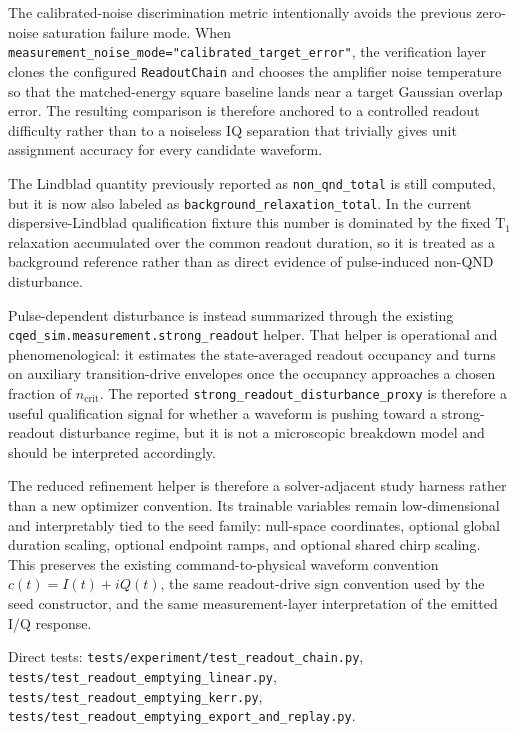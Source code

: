 \documentclass[11pt]{article}
\begin{document}
\noindent
The calibrated-noise discrimination metric intentionally avoids the previous
zero-noise saturation failure mode. When
\texttt{measurement\_noise\_mode="calibrated\_target\_error"}, the verification
layer clones the configured \texttt{ReadoutChain} and chooses the amplifier noise
temperature so that the matched-energy square baseline lands near a target Gaussian
overlap error. The resulting comparison is therefore anchored to a controlled
readout difficulty rather than to a noiseless IQ separation that trivially gives
unit assignment accuracy for every candidate waveform.

\noindent
The Lindblad quantity previously reported as \texttt{non\_qnd\_total} is still
computed, but it is now also labeled as
\texttt{background\_relaxation\_total}. In the current dispersive-Lindblad
qualification fixture this number is dominated by the fixed \(\mathrm{T}_1\)
relaxation accumulated over the common readout duration, so it is treated as a
background reference rather than as direct evidence of pulse-induced non-QND
disturbance.

\noindent
Pulse-dependent disturbance is instead summarized through the existing
\texttt{cqed\_sim.measurement.strong\_readout} helper. That helper is
operational and phenomenological: it estimates the state-averaged readout occupancy
and turns on auxiliary transition-drive envelopes once the occupancy approaches a
chosen fraction of \(n_{\mathrm{crit}}\). The reported
\texttt{strong\_readout\_disturbance\_proxy} is therefore a useful qualification
signal for whether a waveform is pushing toward a strong-readout disturbance regime,
but it is not a microscopic breakdown model and should be interpreted accordingly.

\noindent
The reduced refinement helper is therefore a solver-adjacent study harness rather
than a new optimizer convention. Its trainable variables remain low-dimensional and
interpretably tied to the seed family: null-space coordinates, optional global
duration scaling, optional endpoint ramps, and optional shared chirp scaling. This
preserves the existing command-to-physical waveform convention
\(c(t)=I(t)+iQ(t)\), the same readout-drive sign convention used by the seed
constructor, and the same measurement-layer interpretation of the emitted I/Q
response.

\noindent
Direct tests: \texttt{tests/experiment/test\_readout\_chain.py},
\texttt{tests/test\_readout\_emptying\_linear.py},
\texttt{tests/test\_readout\_emptying\_kerr.py},
\texttt{tests/test\_readout\_emptying\_export\_and\_replay.py}.
\end{document}
